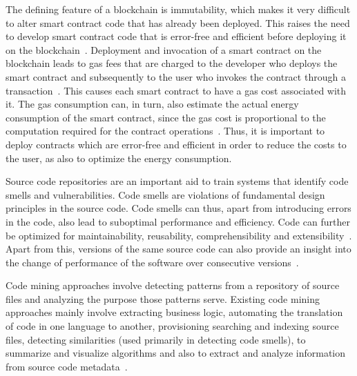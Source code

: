 \documentclass[10pt,conference]{IEEEtran}
\begin{document}
	The defining feature of a blockchain is immutability, which makes it very difficult to alter smart contract code that has already been deployed. This raises the need to develop smart contract code that is error-free and efficient before deploying it on the blockchain~\cite{brandstatter}. Deployment and invocation of a smart contract on the blockchain leads to gas fees that are charged to the developer who deploys the smart contract and subsequently to the user who invokes the contract through a transaction~\cite{ethpaper}. This causes each smart contract to have a gas cost associated with it. The gas consumption can, in turn, also estimate the actual energy consumption of the smart contract, since the gas cost is proportional to the computation required for the contract operations~\cite{contractenergyconsumptionthesis}. Thus, it is important to deploy contracts which are error-free and efficient in order to reduce the costs to the user, as also to optimize the energy consumption. 
	
	Source code repositories are an important aid to train systems that identify code smells and vulnerabilities. Code smells  are violations of fundamental design principles in the source code. Code smells can thus, apart from introducing errors in the code, also lead to suboptimal performance and efficiency. Code can further be optimized for maintainability, reusability, comprehensibility and extensibility~\cite{codesmellmining}. Apart from this, versions of the same source code can also provide an insight into the change of performance of the software over consecutive versions~\cite{softwareversion}. 
	
	Code mining approaches involve detecting patterns from a repository of source files and analyzing the purpose those patterns serve. Existing code mining approaches mainly involve extracting business logic, automating the translation of code in one language to another, provisioning searching and indexing source files, detecting similarities (used primarily in detecting code smells), to summarize and visualize algorithms and also to extract and analyze information from source code metadata~\cite{codeminingsurvey}.
	
\end{document}
